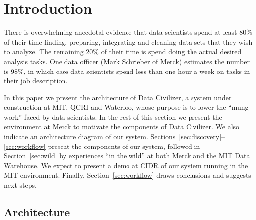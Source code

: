 \section{Introduction}
\label{introduction}

There is overwhelming anecdotal evidence that data scientists spend at least 80\%
of their time finding, preparing, integrating and cleaning data sets that they
wish to analyze. The remaining 20\% of their time is spend doing the actual desired 
analysis tasks.
One data officer (Mark Schrieber of
Merck) estimates the number is 98\%, in which case data scientists spend less
than one hour a week on tasks in their job description.

In this paper we present the architecture of Data Civilizer, a system under
construction at MIT, QCRI and Waterloo, whose purpose is to lower the ``mung work'' 
faced by data scientists.  In the rest of this section we present the
environment at Merck to motivate the components of Data Civilizer.  We also
indicate an architecture diagram of our system.   
Sections~\ref{sec:discovery}--\ref{sec:workflow} present the
components of our system, followed in Section~\ref{sec:wild} by experiences ``in the wild'' at
both Merck and the MIT Data Warehouse.  We expect to present a demo at CIDR
of our system running in the MIT environment.  Finally, Section~\ref{sec:workflow} draws
conclusions and suggests next steps.

\subsection{Architecture}

